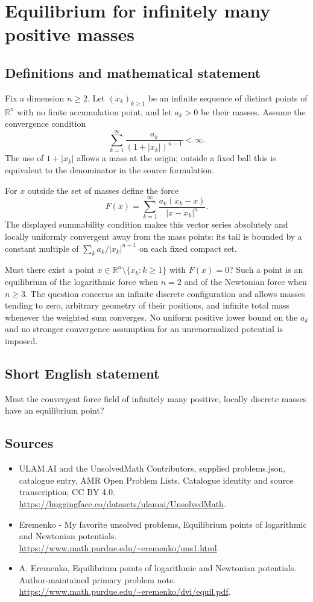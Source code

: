 \documentclass[11pt,a4paper]{article}
\begin{document}
\section*{Equilibrium for infinitely many positive masses}\label{statement}

\subsection{Definitions and mathematical statement}
Fix a dimension $n\geq2$. Let $(x_k)_{k\geq1}$ be an
infinite sequence of distinct points of $\mathbb R^n$
with no finite accumulation point, and let $a_k>0$ be
their masses. Assume the convergence condition
\[
             \sum_{k=1}^{\infty}
                    \frac{a_k}{(1+|x_k|)^{n-1}}<\infty.
\]
The use of $1+|x_k|$ allows a mass at the origin; outside
a fixed ball this is equivalent to the denominator in
the source formulation.

For $x$ outside the set of masses define the force
\[
       F(x)=\sum_{k=1}^{\infty}
                 \frac{a_k(x_k-x)}{|x-x_k|^n}.
\]
The displayed summability condition makes this vector series
absolutely and locally uniformly convergent away from the
mass points: its tail is bounded by a constant multiple
of $\sum_k a_k/|x_k|^{n-1}$ on each fixed compact set.

Must there exist a point
$x\in\mathbb R^n\setminus\{x_k:k\geq1\}$ with $F(x)=0$?
Such a point is an equilibrium of the logarithmic force
when $n=2$ and of the Newtonian force when $n\geq3$.
The question concerns an infinite discrete configuration
and allows masses tending to zero, arbitrary geometry of
their positions, and infinite total mass whenever the
weighted sum converges. No uniform positive lower bound
on the $a_k$ and no stronger convergence assumption for
an unrenormalized potential is imposed.
\subsection{Short English statement}
Must the convergent force field of infinitely many positive, locally discrete masses have an equilibrium point?
\subsection{Sources}
\begin{itemize}
\item[S1] ULAM.AI and the UnsolvedMath Contributors, supplied problems.json, catalogue entry, AMR Open Problem Lists. Catalogue identity and source transcription; CC BY 4.0.
\url{https://huggingface.co/datasets/ulamai/UnsolvedMath}.
\item[S2] Eremenko - My favorite unsolved problems, Equilibrium points of logarithmic and Newtonian potentials. 
\url{https://www.math.purdue.edu/~eremenko/uns1.html}.
\item[S3] A. Eremenko, Equilibrium points of logarithmic and Newtonian potentials. Author-maintained primary problem note.
\url{https://www.math.purdue.edu/~eremenko/dvi/equil.pdf}.
\end{itemize}
\end{document}

